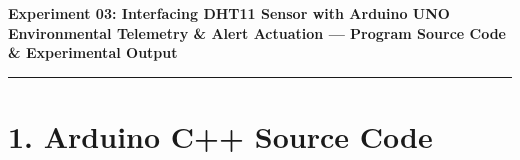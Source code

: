 \documentclass[10pt,a4paper]{article}
\begin{document}
\begin{center}
    {\large\bfseries Experiment 03: Interfacing DHT11 Sensor with Arduino UNO}\\[0.06cm]
    {\normalsize\textbf{Environmental Telemetry \& Alert Actuation --- Program Source Code \& Experimental Output}}
\end{center}
\vspace{-0.24cm}
\rule{\textwidth}{0.8pt}
\vspace{0.06cm}

\section*{1. Arduino C++ Source Code}
\end{document}
